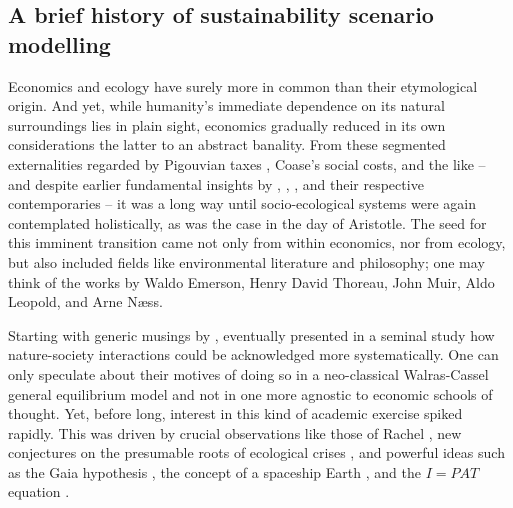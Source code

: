\documentclass{article}
\begin{document}
\begin{refsection}

\section{A brief history of sustainability scenario modelling}

Economics and ecology have surely more in common than their etymological origin. And yet, while humanity's immediate dependence on its natural surroundings lies in plain sight, economics gradually reduced in its own considerations the latter to an abstract banality. From these segmented externalities regarded by Pigouvian taxes \parencites{pigou_2017}[see also][]{baumol_1972}, Coase's \parencite*{coase_1960} social costs, and the like -- and despite earlier fundamental insights by \textcite{carlowitz_1713}, \textcite{jevons_1865}, \textcite{arrhenius_1896}, and their respective contemporaries -- it was a long way until socio-ecological systems were again contemplated holistically, as was the case in the day of Aristotle. The seed for this imminent transition came not only from within economics, nor from ecology, but also included fields like environmental literature and philosophy; one may think of the works by Waldo Emerson, Henry David Thoreau, John Muir, Aldo Leopold, and Arne Næss.

Starting with generic musings by \textcite{daly_1968,isard_1968,cumberland_1966}, \textcite{ayres_kneese_1969} eventually presented in a seminal study how nature-society interactions could be acknowledged more systematically. One can only speculate about their motives of doing so in a neo-classical Walras-Cassel general equilibrium model and not in one more agnostic to economic schools of thought. Yet, before long, interest in this kind of academic exercise spiked rapidly. This was driven by crucial observations like those of Rachel \textcite{carson_1962}, new conjectures on the presumable roots of ecological crises \parencite{white_1967}, and powerful ideas such as the Gaia hypothesis \parencite{lovelock_1972,lovelock_1974}, the concept of a spaceship Earth \parencite{boulding_1966}, and the $I=PAT$ equation \parencite{ehrlich_1972,commoner_1972,chertow_2001}.


\end{refsection}
\end{document}
